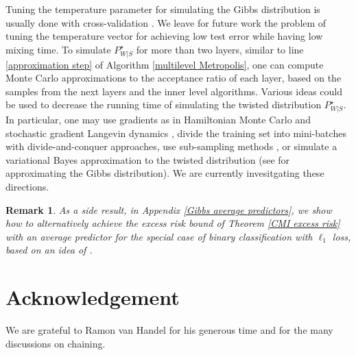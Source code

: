 \documentclass{article}
\newtheorem{remark}{Remark}
\begin{document}
Tuning the temperature parameter
for simulating the Gibbs distribution
is usually done with cross-validation \cite{catoni2007pac, 
guedj2019primer}. We leave for future work the problem of tuning the temperature vector for achieving low test error while having 
low mixing time.  
To simulate $P^{\star}_{W|S}$ for more than two layers, similar to line \ref{approximation step} of Algorithm \ref{multilevel Metropolis}, one can compute Monte Carlo approximations to the acceptance ratio of each layer, based on the samples from the next layers and the inner level algorithms.
Various ideas could be used to decrease the running time of simulating the twisted distribution $P^{\star}_{W|S}$. In particular, one may use  gradients as in Hamiltonian Monte Carlo \cite{neal1992bayesian, chen2014stochastic} and stochastic gradient Langevin dynamics \cite{welling2011bayesian}, divide the training set into mini-batches with divide-and-conquer approaches, use sub-sampling methods \cite{bardenet2017markov}, or simulate a variational Bayes approximation to the twisted distribution (see \cite{alquier2016properties} for approximating the Gibbs distribution). We are currently invesitgating these directions. 

\begin{remark}\normalfont
As a side result, in Appendix \ref{Gibbs average predictors}, we show how to alternatively achieve the excess risk bound of Theorem \ref{CMI excess risk} with an \emph{average predictor} for the special case of binary classification with $\ell_1$ loss, based on an idea of \cite{cesa1999prediction}.  
\end{remark}

\section{Acknowledgement}
We are grateful to Ramon van Handel for his generous time and for the many discussions on chaining.


\newpage
\appendix
\end{document}
